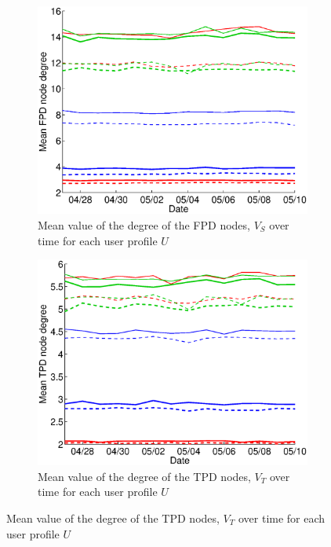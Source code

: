 \documentclass{sig-alternate}
\begin{document}
  \begin{figure}
   \centering

   \begin{subfigure}{.45\textwidth}
    \includegraphics[width=\textwidth]{figures/plots/first-means.eps}
    \caption{Mean value of the degree of the FPD nodes, $V_S$ over time for each user profile $U$}
    \label{fig:first_means}
  \end{subfigure}

  \begin{subfigure}{.45\textwidth}
    \includegraphics[width=\textwidth]{figures/plots/third-means.eps}
    \caption{Mean value of the degree of the TPD nodes, $V_T$ over time for each user profile $U$}
    \label{fig:third_means}
  \end{subfigure}


\end{figure}
\end{document}
